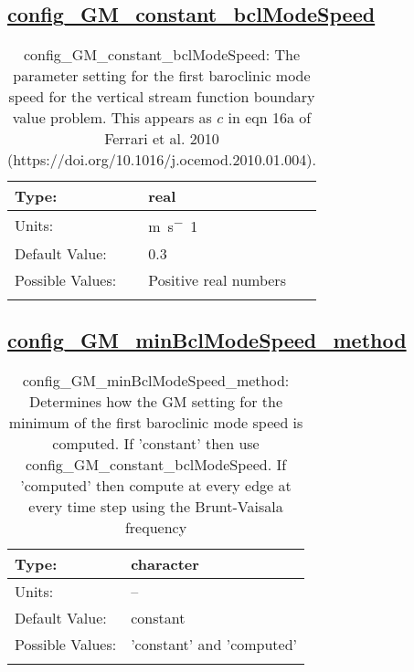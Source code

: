 \subsection[config\_GM\_constant\_bclModeSpeed]{\hyperref[sec:nm_tab_GM_eddy_parameterization]{config\_GM\_constant\_bclModeSpeed}}
\label{subsec:nm_sec_config_GM_constant_bclModeSpeed}
\begin{center}
\begin{longtable}{| p{2.0in} || p{4.0in} |}
    \hline
    Type: & real \\
    \hline
    Units: & \si{m.s^-1} \\
    \hline
    Default Value: & 0.3 \\
    \hline
    Possible Values: & Positive real numbers \\
    \hline
    \caption{config\_GM\_constant\_bclModeSpeed: The parameter setting for the first baroclinic mode speed for the vertical stream function boundary value problem. This appears as $c$ in eqn 16a of Ferrari et al. 2010 (https://doi.org/10.1016/j.ocemod.2010.01.004).}
\end{longtable}
\end{center}
\subsection[config\_GM\_minBclModeSpeed\_method]{\hyperref[sec:nm_tab_GM_eddy_parameterization]{config\_GM\_minBclModeSpeed\_method}}
\label{subsec:nm_sec_config_GM_minBclModeSpeed_method}
\begin{center}
\begin{longtable}{| p{2.0in} || p{4.0in} |}
    \hline
    Type: & character \\
    \hline
    Units: & -- \\
    \hline
    Default Value: & constant \\
    \hline
    Possible Values: & 'constant' and 'computed' \\
    \hline
    \caption{config\_GM\_minBclModeSpeed\_method: Determines how the GM setting for the minimum of the first baroclinic mode speed is computed. If 'constant' then use config\_GM\_constant\_bclModeSpeed. If 'computed' then compute at every edge at every time step using the Brunt-Vaisala frequency}
\end{longtable}
\end{center}
